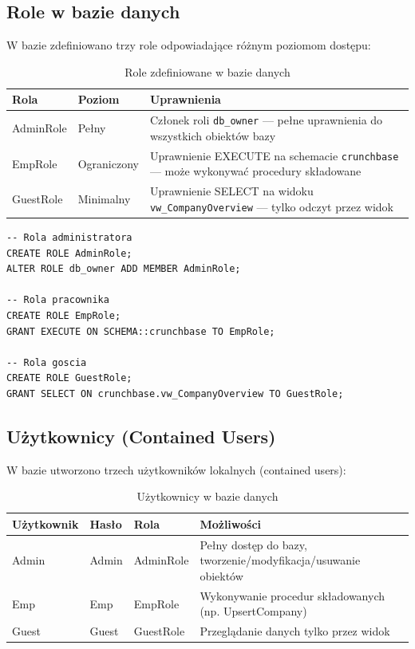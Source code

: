 \documentclass[12pt,a4paper]{article}
\begin{document}
\subsection{Role w bazie danych}

W bazie zdefiniowano trzy role odpowiadające różnym poziomom dostępu:

\begin{table}[H]
\centering
\caption{Role zdefiniowane w bazie danych}
\begin{tabular}{|l|l|p{7cm}|}
\hline
\textbf{Rola} & \textbf{Poziom} & \textbf{Uprawnienia} \\
\hline
AdminRole & Pełny & Członek roli \texttt{db\_owner} --- pełne uprawnienia do wszystkich obiektów bazy \\
\hline
EmpRole & Ograniczony & Uprawnienie EXECUTE na schemacie \texttt{crunchbase} --- może wykonywać procedury składowane \\
\hline
GuestRole & Minimalny & Uprawnienie SELECT na widoku \texttt{vw\_CompanyOverview} --- tylko odczyt przez widok \\
\hline
\end{tabular}
\end{table}

\begin{lstlisting}[caption={Tworzenie ról i nadawanie uprawnień}]
-- Rola administratora
CREATE ROLE AdminRole;
ALTER ROLE db_owner ADD MEMBER AdminRole;

-- Rola pracownika
CREATE ROLE EmpRole;
GRANT EXECUTE ON SCHEMA::crunchbase TO EmpRole;

-- Rola goscia
CREATE ROLE GuestRole;
GRANT SELECT ON crunchbase.vw_CompanyOverview TO GuestRole;
\end{lstlisting}

\subsection{Użytkownicy (Contained Users)}

W bazie utworzono trzech użytkowników lokalnych (contained users):

\begin{table}[H]
\centering
\caption{Użytkownicy w bazie danych}
\begin{tabular}{|l|l|l|p{5cm}|}
\hline
\textbf{Użytkownik} & \textbf{Hasło} & \textbf{Rola} & \textbf{Możliwości} \\
\hline
Admin & Admin & AdminRole & Pełny dostęp do bazy, tworzenie/modyfikacja/usuwanie obiektów \\
\hline
Emp & Emp & EmpRole & Wykonywanie procedur składowanych (np. UpsertCompany) \\
\hline
Guest & Guest & GuestRole & Przeglądanie danych tylko przez widok \\
\hline
\end{tabular}
\end{table}
\end{document}
